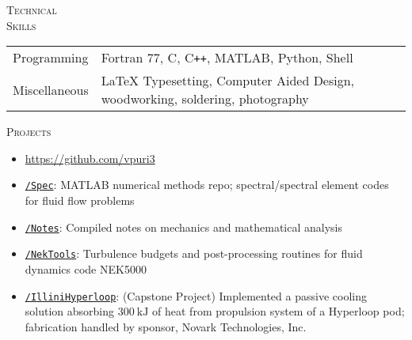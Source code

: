 \documentclass[10pt]{article}
\begin{document}
\vspace{-1.5em}
\begin{multicols}{2}
\textsc{\small Technical \\ Skills}
\columnbreak

\begin {table}[H]
\begin{tabular}{l l }
\hspace{-0.5em}Programming   & \hspace{-0.0em} Fortran 77, C, C\texttt{++}, MATLAB, Python, Shell\\
\hspace{-0.5em}Miscellaneous & \hspace{-0.0em} \LaTeX{} Typesetting, Computer Aided Design, woodworking, soldering, photography \\
\end{tabular}	
\end{table}

\end{multicols}
\vspace{-1.5em}
\begin{multicols}{2}
\textsc{\small Projects}
\columnbreak

\vspace{-1.75em}
\begin{itemize}[label=-]
    \setlength{\itemindent}{-1.75em}
    \setlength\itemsep{-0.25em}
    \item[]\hspace{-1.0em} \url{https://github.com/vpuri3}
    \item \href{https://github.com/vpuri3/Spec}{\texttt{/Spec}}: MATLAB numerical methods repo; spectral/spectral element codes for fluid flow problems
    \item \href{https://github.com/vpuri3/Notes}{\texttt{/Notes}}: Compiled notes on mechanics and mathematical analysis
    \item \href{https://github.com/vpuri3/NekTools}{\texttt{/NekTools}}: Turbulence budgets and post-processing routines for fluid dynamics code NEK5000
    \item \href{https://github.com/vpuri3/IlliniHyperloop}{\texttt{/IlliniHyperloop}}: (Capstone Project) Implemented a passive cooling solution absorbing $\SI{300}{\kilo \joule}$ of heat from propulsion system of a Hyperloop pod; fabrication handled by sponsor, Novark Technologies, Inc.
\end{itemize}
\vspace{-2.0em}

\end{multicols}
\vspace{-1.5em}
\vfill
\end{document}
